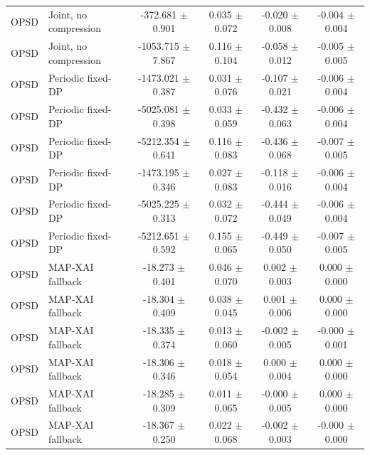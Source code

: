 \begin{tabular}{llcccc}
OPSD & Joint, no compression & -372.681 $\pm$ 0.901 & 0.035 $\pm$ 0.072 & -0.020 $\pm$ 0.008 & -0.004 $\pm$ 0.004 \\
OPSD & Joint, no compression & -1053.715 $\pm$ 7.867 & 0.116 $\pm$ 0.104 & -0.058 $\pm$ 0.012 & -0.005 $\pm$ 0.005 \\
OPSD & Periodic fixed-DP & -1473.021 $\pm$ 0.387 & 0.031 $\pm$ 0.076 & -0.107 $\pm$ 0.021 & -0.006 $\pm$ 0.004 \\
OPSD & Periodic fixed-DP & -5025.081 $\pm$ 0.398 & 0.033 $\pm$ 0.059 & -0.432 $\pm$ 0.063 & -0.006 $\pm$ 0.004 \\
OPSD & Periodic fixed-DP & -5212.354 $\pm$ 0.641 & 0.116 $\pm$ 0.083 & -0.436 $\pm$ 0.068 & -0.007 $\pm$ 0.005 \\
OPSD & Periodic fixed-DP & -1473.195 $\pm$ 0.346 & 0.027 $\pm$ 0.083 & -0.118 $\pm$ 0.016 & -0.006 $\pm$ 0.004 \\
OPSD & Periodic fixed-DP & -5025.225 $\pm$ 0.313 & 0.032 $\pm$ 0.072 & -0.444 $\pm$ 0.049 & -0.006 $\pm$ 0.004 \\
OPSD & Periodic fixed-DP & -5212.651 $\pm$ 0.592 & 0.155 $\pm$ 0.065 & -0.449 $\pm$ 0.050 & -0.007 $\pm$ 0.005 \\
OPSD & MAP-XAI fallback & -18.273 $\pm$ 0.401 & 0.046 $\pm$ 0.070 & 0.002 $\pm$ 0.003 & 0.000 $\pm$ 0.000 \\
OPSD & MAP-XAI fallback & -18.304 $\pm$ 0.409 & 0.038 $\pm$ 0.045 & 0.001 $\pm$ 0.006 & 0.000 $\pm$ 0.000 \\
OPSD & MAP-XAI fallback & -18.335 $\pm$ 0.374 & 0.013 $\pm$ 0.060 & -0.002 $\pm$ 0.005 & -0.000 $\pm$ 0.001 \\
OPSD & MAP-XAI fallback & -18.306 $\pm$ 0.346 & 0.018 $\pm$ 0.054 & 0.000 $\pm$ 0.004 & 0.000 $\pm$ 0.000 \\
OPSD & MAP-XAI fallback & -18.285 $\pm$ 0.309 & 0.011 $\pm$ 0.065 & -0.000 $\pm$ 0.005 & 0.000 $\pm$ 0.000 \\
OPSD & MAP-XAI fallback & -18.367 $\pm$ 0.250 & 0.022 $\pm$ 0.068 & -0.002 $\pm$ 0.003 & -0.000 $\pm$ 0.000 \\
\bottomrule
\end{tabular}
